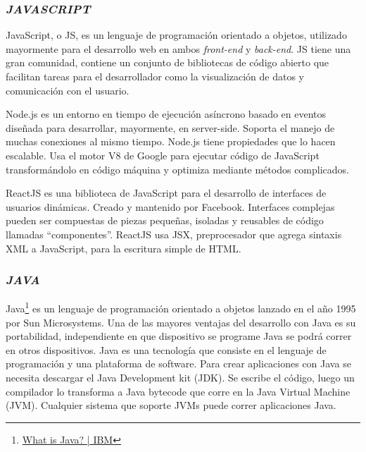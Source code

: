 \subsubsection{\textit{JAVASCRIPT}}

JavaScript, o JS, es un lenguaje de programación orientado a objetos, utilizado mayormente para el desarrollo web en ambos \textit{front-end} y \textit{back-end}. JS tiene una gran comunidad, contiene un conjunto de bibliotecas de código abierto que facilitan tareas para el desarrollador como la visualización de datos y comunicación con el usuario.


Node.js es un entorno en tiempo de ejecución asíncrono basado en eventos diseñada para desarrollar, mayormente, en server-side. Soporta el manejo de muchas conexiones al mismo tiempo. Node.js tiene propiedades que lo hacen escalable. Usa el motor V8 de Google para ejecutar código de JavaScript transformándolo en código máquina y optimiza mediante métodos complicados. \cite{webframedbws}


ReactJS es una biblioteca de JavaScript para el desarrollo de interfaces de usuarios dinámicas. Creado y mantenido por Facebook. Interfaces complejas pueden ser compuestas de piezas pequeñas, isoladas y reusables de código llamadas “componentes”. ReactJS usa JSX, preprocesador que agrega sintaxis XML a JavaScript, para la escritura simple de HTML. \cite{webframedbws}

\subsubsection{\textit{JAVA}}

Java\footnote{\href{https://www.ibm.com/cloud/learn/java-explained}{What is Java? | IBM}} es un lenguaje de programación orientado a objetos lanzado en el año 1995 por Sun Microsystems. Una de las mayores ventajas del desarrollo con Java es su portabilidad, independiente en que dispositivo se programe Java se podrá correr en otros dispositivos.
Java es una tecnología que consiste en el lenguaje de programación y una plataforma de software. Para crear aplicaciones con Java se necesita descargar el Java Development kit (JDK). Se escribe el código, luego un compilador lo transforma a Java bytecode que corre en la Java Virtual Machine (JVM). Cualquier sistema que soporte JVMs puede correr aplicaciones Java.

